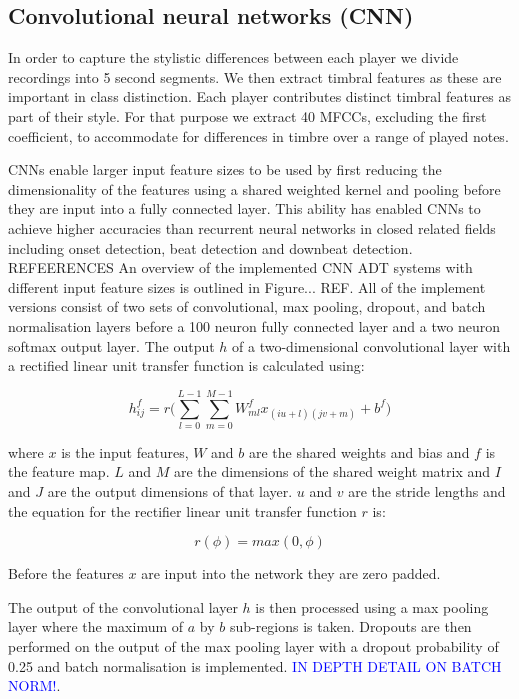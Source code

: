 \documentclass{article}
\newcommand{\carl}[1]{\textcolor{blue}{#1}}
\begin{document}
{\subsection{Convolutional neural networks (CNN)}
In order to capture the stylistic differences between each player we divide recordings into 5 second segments. We then extract timbral features as these are important in class distinction. Each player contributes distinct timbral features as part of their style. For that purpose we extract 40 MFCCs, excluding the first coefficient, to accommodate for differences in timbre over a range of played notes.%

%
CNNs enable larger input feature sizes to be used by first reducing the dimensionality of the features using a shared weighted kernel and pooling before they are input into a fully connected layer. This ability has enabled CNNs to achieve higher accuracies than recurrent neural networks in closed related fields including onset detection, beat detection and downbeat detection. REFEERENCES  An overview of the implemented CNN ADT systems with different input feature sizes is outlined in Figure... REF. All of the implement versions consist of two sets of convolutional, max pooling, dropout, and batch normalisation layers before a 100 neuron fully connected layer and a two neuron softmax output layer. The output $h$ of a two-dimensional convolutional layer with a rectified linear unit transfer function is calculated using:

\begin{equation}\label{eqn:conv}
 h^f_{ij}=r\Bigg(\sum_{l=0}^{L-1}\sum_{m=0}^{M-1} W^f_{ml}x_{(iu+l)(jv+m)}+b^f\Bigg)
\end{equation}

where $x$ is the input features, $W$ and $b$ are the shared weights and bias and $f$ is the feature map. $L$ and $M$ are the dimensions of the shared weight matrix and $I$ and $J$ are the output dimensions of that layer. $u$ and $v$ are the stride lengths and the equation for the rectifier linear unit transfer function $r$ is:

\begin{equation}\label{eqn:rect}
r(\phi)=max(0,\phi)
\end{equation}

Before the features $x$ are input into the network they are zero padded.

The output of the convolutional layer $h$ is then processed using a max pooling layer where the maximum of $a$ by $b$ sub-regions is taken. Dropouts are then performed on the output of the max pooling layer with a dropout probability of 0.25 and batch normalisation is implemented. \carl{IN DEPTH DETAIL ON BATCH NORM!}.

}
\end{document}
